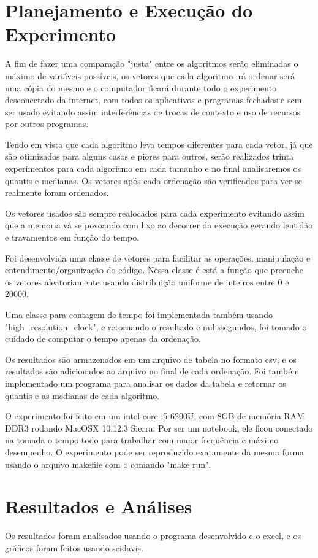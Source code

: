 \documentclass[a4paper, 10pt]{article}
\begin{document}
\section{Planejamento e Execução do Experimento}
A fim de fazer uma comparação "justa" entre os algoritmos serão eliminadas o máximo de variáveis possíveis, os vetores que cada algoritmo irá ordenar será uma cópia do mesmo e o computador ficará durante todo o experimento desconectado da internet, com todos os aplicativos e programas fechados e sem ser usado evitando assim interferências de trocas de contexto e uso de recursos por outros programas.

Tendo em vista que cada algoritmo leva tempos diferentes para cada vetor, já que são otimizados para alguns casos e piores para outros, serão realizados trinta experimentos para cada algoritmo em cada tamanho e no final analisaremos os quantis e medianas. Os vetores após cada ordenação são verificados para ver se realmente foram ordenados.

Os vetores usados são sempre realocados para cada experimento evitando assim que a memoria vá se povoando com lixo ao decorrer da execução gerando lentidão e travamentos em função do tempo.

Foi desenvolvida uma classe de vetores para facilitar as operações, manipulação e entendimento/organização do código. Nessa classe é está a função que preenche os vetores aleatoriamente usando distribuição uniforme de inteiros entre 0 e 20000. 

Uma classe para contagem de tempo foi implementada também usando "high\_resolution\_clock", e retornando o resultado e milissegundos, foi tomado o cuidado de computar o tempo apenas da ordenação.

Os resultados são armazenados em um arquivo de tabela no formato csv, e os resultados são adicionados ao arquivo no final de cada ordenação.
Foi também implementado um programa para analisar os dados da tabela e retornar os quantis e as medianas de cada algoritmo.

O experimento foi feito em um intel core i5-6200U, com 8GB de memória RAM DDR3 rodando MacOSX 10.12.3 Sierra. Por ser um notebook, ele ficou conectado na tomada o tempo todo para trabalhar com maior frequência e máximo desempenho. O experimento pode ser reproduzido exatamente da mesma forma usando o arquivo makefile com o comando "make run".
\section{Resultados e Análises}
Os resultados foram analisados usando o programa desenvolvido e o excel, e os gráficos foram feitos usando scidavis.
\end{document}
